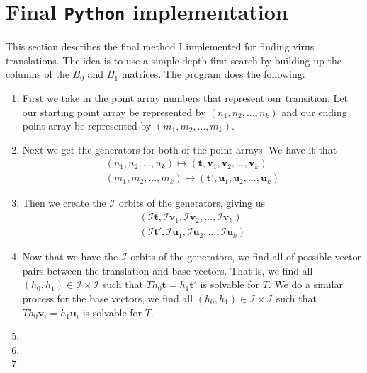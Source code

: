 \documentclass[a4paper,10pt]{article}
\theoremstyle{plain}
\theoremstyle{definition}
\theoremstyle{remark}
\renewcommand{\vec}[1]{\textbf{#1}}
\begin{document}
\section{Final \texttt{Python} implementation}
This section describes the final method I implemented for finding virus translations.
The idea is to use a simple depth first search by building up the columns of the \(B_0\) and \(B_1\) matrices.
The program does the following:
\begin{enumerate}
    \item First we take in the point array numbers that represent our transition.
        Let our starting point array be represented by \((n_1, n_2, \dots, n_k)\) and our ending point array be represented by \((m_1, m_2, \dots, m_k)\).

    \item Next we get the generators for both of the point arrays. 
        We have it that \begin{gather*}
            (n_1, n_2, \dots, n_k) \mapsto (\vec{t}, \vec{v}_1, \vec{v}_2, \dots, \vec{v}_k) \\
            (m_1, m_2, \dots, m_k) \mapsto (\vec{t}', \vec{u}_1, \vec{u}_2, \dots, \vec{u}_k)
        \end{gather*}

    \item Then we create the \(\mathcal{I}\) orbits of the generators, giving us \begin{gather*}
        (\mathcal{I}\vec{t}, \mathcal{I}\vec{v}_1, \mathcal{I}\vec{v}_2, \dots, \mathcal{I}\vec{v}_k) \\ 
        (\mathcal{I}\vec{t}', \mathcal{I}\vec{u}_1, \mathcal{I}\vec{u}_2, \dots, \mathcal{I}\vec{u}_k)
        \end{gather*}

    \item Now that we have the \(\mathcal{I}\) orbits of the generators, we find all of possible vector pairs between the translation and base vectors.
        That is, we find all \((h_0, h_1) \in \mathcal{I} \times \mathcal{I}\) such that \(Th_0\vec{t} = h_1\vec{t}'\) is solvable for \(T\).
        We do a similar process for the base vectors, we find all \((h_0, h_1) \in \mathcal{I} \times \mathcal{I}\) such that \(Th_0\vec{v}_i = h_1\vec{u}_i\) is solvable for \(T\).

    \item {}

    \item {}

    \item {}
\end{enumerate}
\end{document}
